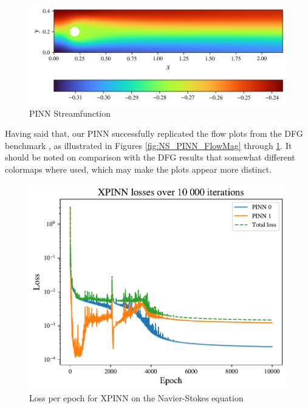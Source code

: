 \begin{figure}[h]
    \centering
    \includegraphics[width=\linewidth]{Project1XPINNs/figures/NavierStokes/NoDecomp/ND_10000_iter_30x25/solution/streamfunc_no_decomp.png}
    \caption{PINN Streamfunction}
    \label{fig:NS_PINN_Streamfunc}
\end{figure}

Having said that, our PINN successfully replicated the flow plots from the DFG benchmark  \cite{DFG}, as illustrated in Figures \ref{fig:NS_PINN_FlowMag} through \ref{fig:NS_PINN_Streamfunc}. It should be noted on comparison with the DFG results that somewhat different colormaps where used, which may make the plots appear more distinct.

\begin{figure}[h]
    \centering
    \includegraphics[width=\linewidth]{Project1XPINNs/figures/NavierStokes/TwoBoxDecomp/TB_10000_iter_right_emphasis/losses/TwoBox_decomp_losses.pdf}
    \caption{Loss per epoch for XPINN on the Navier-Stokes equation}
    \label{fig:NS_XPINN_losses}
\end{figure}

